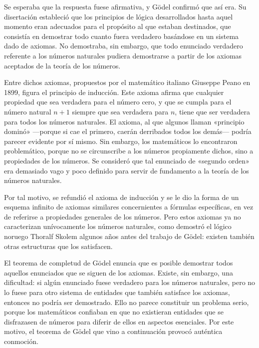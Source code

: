 \documentclass[a4paper, 12pt]{article}
\begin{document}
Se esperaba que la respuesta fuese afirmativa, y Gödel confirmó que así era. Su disertación estableció que los principios de lógica desarrollados hasta aquel momento eran adecuados para el propósito al que estaban destinados, que consistía en demostrar todo cuanto fuera verdadero basándose en un sistema dado de axiomas. No demostraba, sin embargo, que todo enunciado verdadero referente a los números naturales pudiera demostrarse a partir de los axiomas aceptados de la teoría de los números.

Entre dichos axiomas, propuestos por el matemático italiano Giuseppe Peano en 1899, figura el principio de inducción. Este axioma afirma que cualquier propiedad que sea verdadera para el número cero, y que se cumpla para el número natural $n+1$ siempre que sea verdadera para $n$, tiene que ser verdadera para todos los números naturales. El axioma, al que algunos llaman «principio dominó» ---porque si cae el primero, caerán derribados todos los demás--- podría parecer evidente por sí mismo. Sin embargo, los matemáticos lo encontraron problemático, porque no se circunscribe a los números propiamente dichos, sino a propiedades de los números. Se consideró que tal enunciado de «segundo orden» era demasiado vago y poco definido para servir de fundamento a la teoría de los números naturales.

Por tal motivo, se refundió el axioma de inducción y se le dio la forma de un esquema infinito de axiomas similares concernientes a fórmulas específicas, en vez de referirse a propiedades generales de los números. Pero estos axiomas ya no caracterizan unívocamente los números naturales, como demostró el lógico noruego Thoralf Skolem algunos años antes del trabajo de Gödel: existen también otras estructuras que los satisfacen.

El teorema de completud de Gödel enuncia que es posible demostrar todos aquellos enunciados que se siguen de los axiomas. Existe, sin embargo, una dificultad: si algún enunciado fuese verdadero para los números naturales, pero no lo fuese para otro sistema de entidades que también satisface los axiomas, entonces no podría ser demostrado. Ello no parece constituir un problema serio, porque los matemáticos confiaban en que no existieran entidades que se disfrazasen de números para diferir de ellos en aspectos esenciales. Por este motivo, el teorema de Gödel que vino a continuación provocó auténtica conmoción.
\end{document}
